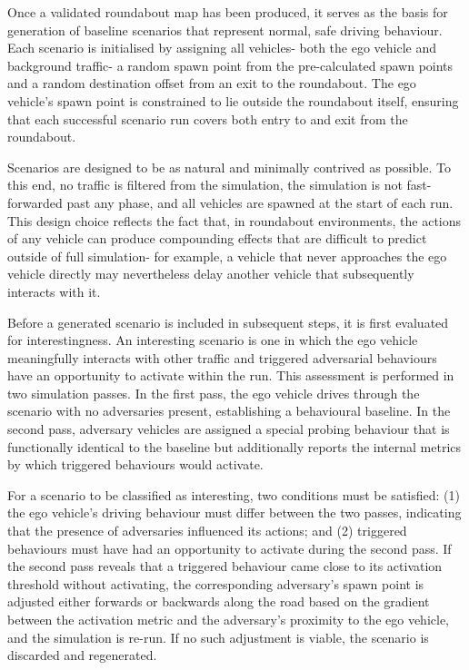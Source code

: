 Once a validated roundabout map has been produced, it serves as the basis for generation of baseline scenarios that represent normal, safe driving behaviour. Each scenario is initialised by assigning all vehicles- both the ego vehicle and background traffic- a random spawn point from the pre-calculated spawn points and a random destination offset from an exit to the roundabout. The ego vehicle's spawn point is constrained to lie outside the roundabout itself, ensuring that each successful scenario run covers both entry to and exit from the roundabout.

Scenarios are designed to be as natural and minimally contrived as possible. To this end, no traffic is filtered from the simulation, the simulation is not fast-forwarded past any phase, and all vehicles are spawned at the start of each run. This design choice reflects the fact that, in roundabout environments, the actions of any vehicle can produce compounding effects that are difficult to predict outside of full simulation- for example, a vehicle that never approaches the ego vehicle directly may nevertheless delay another vehicle that subsequently interacts with it.

Before a generated scenario is included in subsequent steps, it is first evaluated for interestingness. An interesting scenario is one in which the ego vehicle meaningfully interacts with other traffic and triggered adversarial behaviours have an opportunity to activate within the run. This assessment is performed in two simulation passes. In the first pass, the ego vehicle drives through the scenario with no adversaries present, establishing a behavioural baseline. In the second pass, adversary vehicles are assigned a special probing behaviour that is functionally identical to the baseline but additionally reports the internal metrics by which triggered behaviours would activate.

For a scenario to be classified as interesting, two conditions must be satisfied: (1) the ego vehicle's driving behaviour must differ between the two passes, indicating that the presence of adversaries influenced its actions; and (2) triggered behaviours must have had an opportunity to activate during the second pass. If the second pass reveals that a triggered behaviour came close to its activation threshold without activating, the corresponding adversary's spawn point is adjusted either forwards or backwards along the road based on the gradient between the activation metric and the adversary's proximity to the ego vehicle, and the simulation is re-run. If no such adjustment is viable, the scenario is discarded and regenerated.


